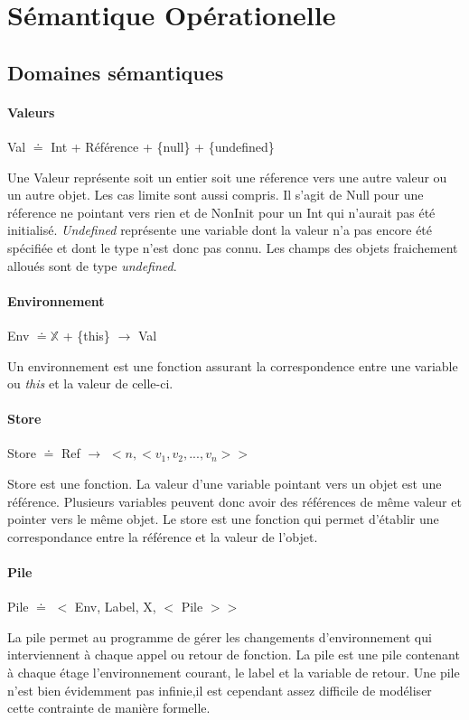 \section{Sémantique Opérationelle}


\subsection{Domaines sémantiques}
\paragraph{Valeurs} Val $\doteq$ Int + Référence + \{null\} + \{undefined\}

Une Valeur représente soit un entier soit une réference vers une autre valeur
ou un autre objet. Les cas limite sont aussi compris. Il s'agit de Null pour 
une réference ne pointant vers rien  et de NonInit pour un Int qui n'aurait 
pas été initialisé. \emph{Undefined} représente une variable dont la valeur n'a
pas encore été spécifiée et dont le type n'est donc pas connu. Les champs
des objets fraichement alloués sont de type \emph{undefined}.

\paragraph{Environnement} Env $\doteq \mathbb{X}$ + \{this\} $\rightarrow$ Val

Un environnement est une fonction assurant la correspondence entre une variable ou \emph{this} et la valeur de celle-ci.

\paragraph{Store} Store $\doteq$ Ref $\rightarrow$ $<n,<v_1,v_2,...,v_n> >$	%

Store est une fonction. La valeur d'une variable pointant vers un objet est une référence. Plusieurs 
variables peuvent donc avoir des références de même valeur et pointer vers le 
même objet. Le store est une fonction qui permet d'établir une correspondance 
entre la référence et la valeur de l'objet.

\paragraph{Pile} Pile $\doteq$ $<$ Env, Label, X, $<$ Pile $> >$ 

La pile permet au programme de gérer les changements d'environnement qui interviennent
à chaque appel ou retour de fonction. La pile est une pile contenant à chaque étage 
l'environnement courant, le label et la variable de retour. Une pile n'est bien évidemment pas infinie,il est cependant assez difficile de modéliser cette contrainte de manière formelle.

